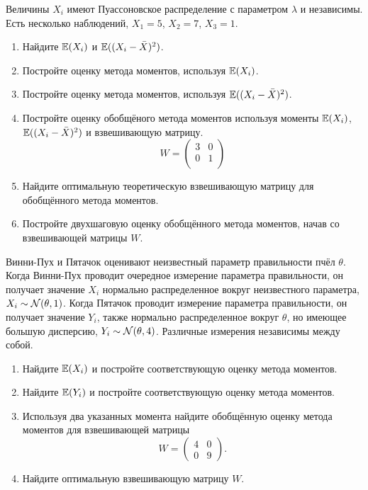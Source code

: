 \begin{problem}
Величины $X_i$ имеют Пуассоновское распределение с параметром $\lambda$ и независимы. Есть несколько наблюдений, $X_1=5$, $X_2=7$, $X_3=1$.

\begin{enumerate}
\item Найдите $\mathbb{E}(X_i)$ и $\mathbb{E}((X_i-\bar X)^2)$.
\item Постройте оценку метода моментов, используя $\mathbb{E}(X_i)$.
\item Постройте оценку метода моментов, используя $\mathbb{E}((X_i-\bar X)^2)$.
\item Постройте оценку обобщёного метода моментов используя моменты $\mathbb{E}(X_i)$, $\mathbb{E}((X_i-\bar X)^2)$ и взвешивающую матрицу.
\[
W=\begin{pmatrix}
3 & 0 \\
0 & 1 \\
\end{pmatrix}
\]
\item Найдите оптимальную теоретическую взвешивающую матрицу для обобщённого метода моментов.
\item Постройте двухшаговую оценку обобщённого метода моментов, начав со взвешивающей матрицы $W$.


\end{enumerate}

\begin{sol}
\end{sol}
\end{problem}


\begin{problem}
Винни-Пух и Пятачок оценивают неизвестный параметр правильности пчёл $\theta$. Когда Винни-Пух проводит очередное измерение параметра правильности, он получает значение $X_i$ нормально распределенное вокруг неизвестного параметра, $X_i \sim \mathcal{N}(\theta, 1)$. Когда Пятачок проводит измерение параметра правильности, он получает значение $Y_i$, также нормально распределенное вокруг $\theta$, но имеющее большую дисперсию, $Y_i \sim \mathcal{N}(\theta, 4)$. Различные измерения независимы между собой.
\begin{enumerate}
\item Найдите $\mathbb{E}(X_i)$ и постройте соответствующую оценку метода моментов.
\item Найдите $\mathbb{E}(Y_i)$ и постройте соответствующую оценку метода моментов.
\item Используя два указанных момента найдите обобщённую оценку метода моментов для взвешивающей матрицы
\[
W = \begin{pmatrix}
4 & 0 \\
0 & 9
\end{pmatrix}.
\]
\item Найдите оптимальную взвешивающую матрицу $W$.
\end{enumerate}
\begin{sol}
\end{sol}
\end{problem}


